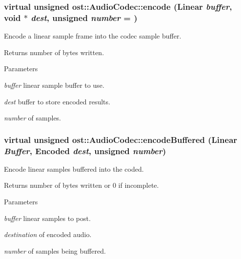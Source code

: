 \subsubsection[{encode}]{\setlength{\rightskip}{0pt plus 5cm}virtual unsigned ost::AudioCodec::encode ({\bf Linear} {\em buffer}, \/  void $\ast$ {\em dest}, \/  unsigned {\em number} = {})\hspace{0.3cm}{\ttfamily  [pure virtual]}}\label{classost_1_1_audio_codec_ad9238d106a0a42bc63be63a305417fb8}


Encode a linear sample frame into the codec sample buffer. \begin{DoxyReturn}{Returns}
number of bytes written. 
\end{DoxyReturn}

\begin{DoxyParams}{Parameters}
\item[{\em buffer}]linear sample buffer to use. \item[{\em dest}]buffer to store encoded results. \item[{\em number}]of samples. \end{DoxyParams}
\subsubsection[{encodeBuffered}]{\setlength{\rightskip}{0pt plus 5cm}virtual unsigned ost::AudioCodec::encodeBuffered ({\bf Linear} {\em Buffer}, \/  {\bf Encoded} {\em dest}, \/  unsigned {\em number})\hspace{0.3cm}{\ttfamily  [virtual]}}\label{classost_1_1_audio_codec_ac430e489a59a79e0837500712e5bbed0}


Encode linear samples buffered into the coded. \begin{DoxyReturn}{Returns}
number of bytes written or 0 if incomplete. 
\end{DoxyReturn}

\begin{DoxyParams}{Parameters}
\item[{\em buffer}]linear samples to post. \item[{\em destination}]of encoded audio. \item[{\em number}]of samples being buffered. \end{DoxyParams}

